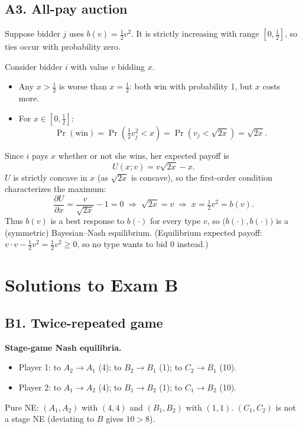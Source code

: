 \documentclass[11pt]{article}
\begin{document}
\subsection*{A3. All-pay auction}
Suppose bidder $j$ uses $b(v)=\tfrac12v^2$. It is strictly increasing with range $[0,\tfrac12]$, so ties occur with probability zero.

Consider bidder $i$ with value $v$ bidding $x$.
\begin{itemize}
  \item Any $x>\tfrac12$ is worse than $x=\tfrac12$: both win with probability 1, but $x$ costs more.
  \item For $x\in[0,\tfrac12]$:
  \[
    \Pr(\text{win})=\Pr\!\left(\tfrac12 v_j^2<x\right)=\Pr\!\left(v_j<\sqrt{2x}\right)=\sqrt{2x}.
  \]
\end{itemize}
Since $i$ pays $x$ whether or not she wins, her expected payoff is
\[
  U(x;v)=v\sqrt{2x}-x .
\]
$U$ is strictly concave in $x$ (as $\sqrt{2x}$ is concave), so the first-order condition characterizes the maximum:
\[
  \frac{\partial U}{\partial x}=\frac{v}{\sqrt{2x}}-1=0
  \;\Longrightarrow\; \sqrt{2x}=v
  \;\Longrightarrow\; x=\tfrac12 v^2 = b(v).
\]
Thus $b(v)$ is a best response to $b(\cdot)$ for every type $v$, so $\big(b(\cdot),b(\cdot)\big)$ is a (symmetric) Bayesian--Nash equilibrium. (Equilibrium expected payoff: $v\cdot v-\tfrac12v^2=\tfrac12v^2\ge0$, so no type wants to bid $0$ instead.)

\section*{Solutions to Exam B}

\subsection*{B1. Twice-repeated game}
\textbf{Stage-game Nash equilibria.}
\begin{itemize}
  \item Player 1: to $A_2\to A_1$ (4); to $B_2\to B_1$ (1); to $C_2\to B_1$ (10).
  \item Player 2: to $A_1\to A_2$ (4); to $B_1\to B_2$ (1); to $C_1\to B_2$ (10).
\end{itemize}
Pure NE: $(A_1,A_2)$ with $(4,4)$ and $(B_1,B_2)$ with $(1,1)$. $(C_1,C_2)$ is not a stage NE (deviating to $B$ gives $10>8$).
\end{document}
